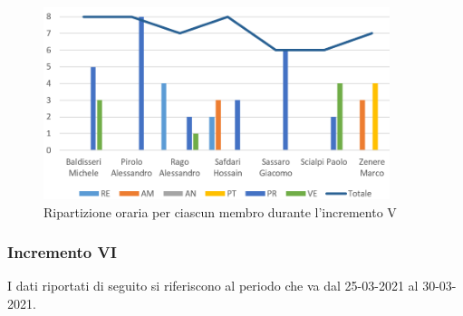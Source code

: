 \begin{figure}[!htb]   
    \centering
    \includegraphics[width=0.9\textwidth]{Images/inc5}
	\caption{Ripartizione oraria per ciascun membro durante l'incremento V}
\end{figure}

\subsubsection{Incremento VI}

I dati riportati di seguito si riferiscono al periodo che va dal 25-03-2021 al 30-03-2021.

